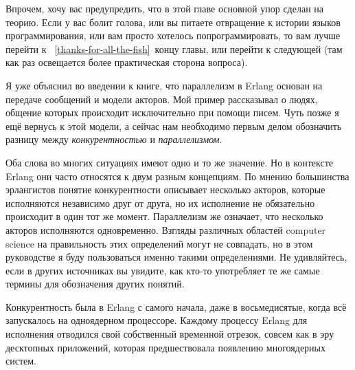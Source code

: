 Впрочем, хочу вас предупредить, что в этой главе основной упор сделан на теорию.
Если у вас болит голова, или вы питаете отвращение к истории языков программирования, или вам просто хотелось попрограммировать, то вам лучше перейти к ~\ref{thanks-for-all-the-fish}~концу главы, или перейти к следующей (там как раз освещается более практическая сторона вопроса).

Я уже объяснил во введении к книге, что параллелизм в Erlang основан на передаче сообщений и модели акторов.
Мой пример рассказывал о людях, общение которых происходит исключительно при помощи писем.
Чуть позже я ещё вернусь к этой модели, а сейчас нам необходимо первым делом обозначить разницу между \emph{конкурентностью} и \emph{параллелизмом}.

Оба слова во многих ситуациях имеют одно и то же значение.
Но в контексте Erlang они часто относятся к двум разным концепциям.
По мнению большинства эрлангистов понятие конкурентности описывает несколько акторов, которые исполняются независимо друг от друга, но их исполнение не обязательно происходит в один тот же момент.
Параллелизм же означает, что несколько акторов исполняются одновременно.
Взгляды различных областей computer science на правильность этих определений могут не совпадать, но в этом руководстве я буду пользоваться именно такими определениями.
Не удивляйтесь, если в других источниках вы увидите, как кто\--то употребляет те же самые термины для обозначения других понятий.

Конкурентность была в Erlang с самого начала, даже в восьмедисятые, когда всё запускалось на одноядерном процессоре.
Каждому процессу Erlang для исполнения отводился свой собственный временной отрезок, совсем как в эру десктопных приложений, которая предшествовала появлению многоядерных систем.

